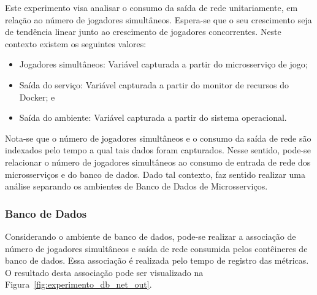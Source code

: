 Este experimento visa analisar o consumo da saída de rede unitariamente, em relação ao número de jogadores simultâneos.
%
Espera-se que o seu crescimento seja de tendência linear junto ao crescimento de jogadores concorrentes.
%
Neste contexto existem os seguintes valores:

\begin{itemize}
    \item Jogadores simultâneos: Variável capturada a partir do microsserviço de jogo;
    \item Saída do serviço: Variável capturada a partir do monitor de recursos do Docker; e
    \item Saída do ambiente: Variável capturada a partir do sistema operacional.
\end{itemize}

Nota-se que o número de jogadores simultâneos e o consumo da saída de rede são indexados pelo tempo a qual tais dados foram capturados.
%
Nesse sentido, pode-se relacionar o número de jogadores simultâneos ao consumo de entrada de rede dos microsserviços e do banco de dados.
%
Dado tal contexto, faz sentido realizar uma análise separando os ambientes de Banco de Dados de Microsserviços.

\subsubsection{Banco de Dados}

Considerando o ambiente de banco de dados, pode-se realizar a associação de número de jogadores simultâneos e saída de rede consumida pelos contêineres de banco de dados.
%
Essa associação é realizada pelo tempo de registro das métricas.
%
O resultado desta associação pode ser visualizado na Figura~\ref{fig:experimento_db_net_out}.

